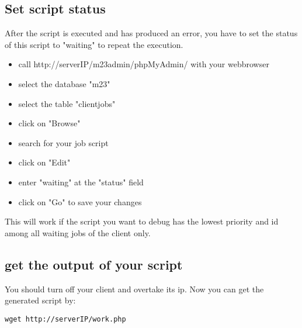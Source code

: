 \subsection{Set script status}
After the script is executed and has produced an error, you have to set the status of this script to "waiting" to repeat the execution.
\begin{itemize}
\item call http://serverIP/m23admin/phpMyAdmin/ with your webbrowser
\item select the database "m23"
\item select the table "clientjobs"
\item click on "Browse"
\item search for your job script
\item click on "Edit"
\item enter "waiting" at the "status" field
\item click on "Go" to save your changes
\end{itemize}
This will work if the script you want to debug has the lowest priority and id among all waiting jobs of the client only.

\subsection{get the output of your script}
You should turn off your client and overtake its ip. Now you can get the generated script by:
\begin{verbatim}
wget http://serverIP/work.php
\end{verbatim}